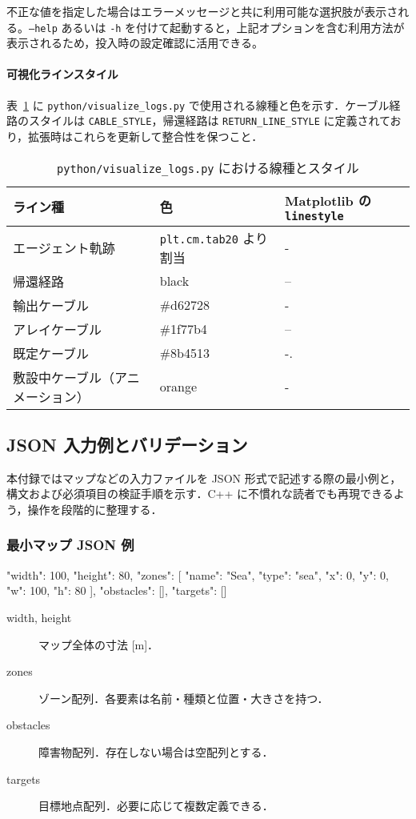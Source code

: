\documentclass[10pt,letterpaper]{jsarticle}
\begin{document}
不正な値を指定した場合はエラーメッセージと共に利用可能な選択肢が表示される。\texttt{--help} あるいは \texttt{-h} を付けて起動すると，上記オプションを含む利用方法が表示されるため，投入時の設定確認に活用できる。

\paragraph{可視化ラインスタイル}
表~\ref{tab:vis-line-style} に \texttt{python/visualize\_logs.py} で使用される線種と色を示す．ケーブル経路のスタイルは \texttt{CABLE\_STYLE}，帰還経路は \texttt{RETURN\_LINE\_STYLE} に定義されており，拡張時はこれらを更新して整合性を保つこと．
\begin{table}[htbp]
  \centering
  \begin{tabular}{lll}
    \toprule
    ライン種 & 色 & Matplotlib の \texttt{linestyle} \\
    \midrule
    エージェント軌跡 & \texttt{plt.cm.tab20} より割当 & - \\
    帰還経路 & black & -- \\
    輸出ケーブル & \#d62728 & - \\
    アレイケーブル & \#1f77b4 & -- \\
    既定ケーブル & \#8b4513 & -. \\
    敷設中ケーブル（アニメーション） & orange & - \\
    \bottomrule
  \end{tabular}
  \caption{\texttt{python/visualize\_logs.py} における線種とスタイル}
  \label{tab:vis-line-style}
\end{table}

\subsection{JSON 入力例とバリデーション}\label{app:jsonvalidate}

本付録ではマップなどの入力ファイルを JSON 形式で記述する際の最小例と，構文および必須項目の検証手順を示す．C++ に不慣れな読者でも再現できるよう，操作を段階的に整理する．

\subsubsection{最小マップ JSON 例}
\begin{jsoncode}
{
  "width": 100,
  "height": 80,
  "zones": [
    {"name": "Sea", "type": "sea", "x": 0, "y": 0, "w": 100, "h": 80}
  ],
  "obstacles": [],
  "targets": []
}
\end{jsoncode}
\begin{description}
  \item[width, height] マップ全体の寸法 [m]．
  \item[zones] ゾーン配列．各要素は名前・種類と位置・大きさを持つ．
  \item[obstacles] 障害物配列．存在しない場合は空配列とする．
  \item[targets] 目標地点配列．必要に応じて複数定義できる．
\end{description}
\end{document}
